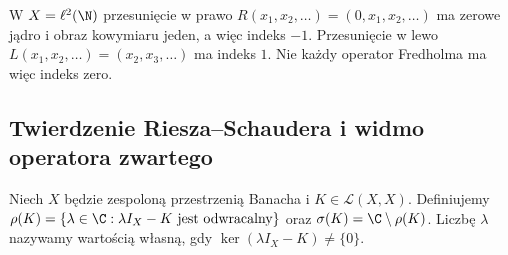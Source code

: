 \begin{przyklad}
\label{ex:shift-index30}
W $X=\ell^2(\N)$ przesunięcie w prawo
$R(x_1,x_2,\ldots)=(0,x_1,x_2,\ldots)$ ma zerowe jądro
i obraz kowymiaru jeden, a więc indeks $-1$.
Przesunięcie w lewo $L(x_1,x_2,\ldots)=(x_2,x_3,\ldots)$
ma indeks $1$. Nie każdy operator Fredholma ma więc
indeks zero.
\end{przyklad}

\subsection{Twierdzenie Riesza--Schaudera i widmo operatora zwartego}

\begin{definicja}
\label{def:spectrum30}
Niech $X$ będzie zespoloną przestrzenią Banacha i
$K\in\mathcal L(X,X)$. Definiujemy
$\rho(K)=\{\lambda\in\C:\lambda I_X-K\text{ jest odwracalny}\}$
oraz $\sigma(K)=\C\setminus\rho(K)$.
Liczbę $\lambda$ nazywamy wartością własną, gdy
$\ker(\lambda I_X-K)\ne\{0\}$.
\end{definicja}


